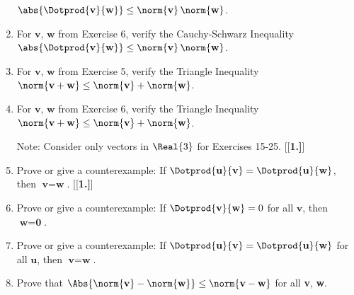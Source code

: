 \begin{enumerate}[\bfseries 1.]
  $\abs{\Dotprod{\textbf{v}}{\textbf{w}}} \le \norm{\textbf{v}}\,\norm{\textbf{w}}$.
 \item For $\textbf{v}$, $\textbf{w}$ from Exercise 6, verify the Cauchy-Schwarz Inequality
  $\abs{\Dotprod{\textbf{v}}{\textbf{w}}} \le \norm{\textbf{v}}\,\norm{\textbf{w}}$.
 \item For $\textbf{v}$, $\textbf{w}$ from Exercise 5, verify the Triangle Inequality
  $\norm{\textbf{v} + \textbf{w}} \le \norm{\textbf{v}} + \norm{\textbf{w}}$.
 \item For $\textbf{v}$, $\textbf{w}$ from Exercise 6, verify the Triangle Inequality
  $\norm{\textbf{v} + \textbf{w}} \le \norm{\textbf{v}} + \norm{\textbf{w}}$.
\vspace{1mm}
\par\noindent Note: Consider only vectors in $\Real{3}$ for Exercises 15-25.\vspace{1mm}
[{[\bfseries 1.]}]
 \item Prove or give a counterexample: If $\Dotprod{\textbf{u}}{\textbf{v}} = \Dotprod{\textbf{u}}{\textbf{w}}$,
  then $\textbf{v} =\textbf{w}$.
[{[\bfseries 1.]}]
 \item Prove or give a counterexample: If $\Dotprod{\textbf{v}}{\textbf{w}} = 0$ for all $\textbf{v}$, then
  $\textbf{w} =\textbf{0}$.
 \item Prove or give a counterexample: If $\Dotprod{\textbf{u}}{\textbf{v}} = \Dotprod{\textbf{u}}{\textbf{w}}$
  for all $\textbf{u}$, then $\textbf{v} =\textbf{w}$.
 \item Prove that $\Abs{\norm{\textbf{v}} - \norm{\textbf{w}}} \le \norm{\textbf{v} - \textbf{w}}$ for all
  \textbf{v}, \textbf{w}.


\end{enumerate}
